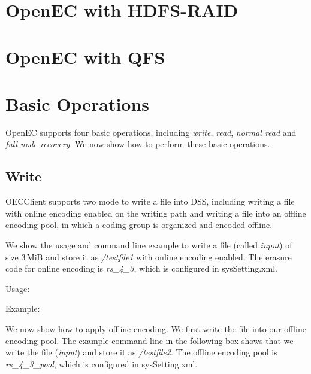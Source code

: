 \documentclass[letterpaper,12pt]{article}
\newcommand{\openec}{{\sf\small OpenEC}\xspace}
\begin{document}
\section{OpenEC with HDFS-RAID}
\label{sec:hdfsraid}

\section{OpenEC with QFS}
\label{sec:qfs}

\section{Basic Operations}

\openec supports four basic operations, including {\sl write}, {\sl read}, {\sl normal read} and
{\sl full-node recovery}. We now show how to perform these basic operations. 

\subsection{Write}

OECClient supports two mode to write a file into DSS, including writing a file with online encoding
enabled on the writing path and writing a file into an offline encoding pool, in which a coding group
is organized and encoded offline.

We show the usage and command line example to write a file (called {\sl input}) of 
size 3\,MiB and store it as {\sl /testfile1} with online encoding enabled. The erasure code 
for online encoding is {\sl rs\_4\_3}, which is configured in sysSetting.xml.

Usage:
\begin{center}
\noindent{}
\end{center}

Example:
\begin{center}
\noindent{}
\end{center}

We now show how to apply offline encoding. We first write the file into our offline encoding pool.
The example command line in the following box shows that we write the file ({\sl input}) and store
it as {\sl /testfile2}. The offline encoding pool is {\sl rs\_4\_3\_pool}, which is configured in sysSetting.xml.
\end{document}
